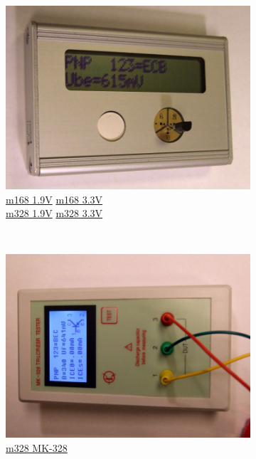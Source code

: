 \documentclass[pdftex,12pt,a4paper,english]{article}
\begin{document}
\begin{figure}[H]
  \begin{subfigure}[b]{.3\textwidth}
    \centering
    \includegraphics[width=1.\textwidth]{../PNG/Fifi_total.JPG}
	  {\href{run:./trunk/mega168_1.9V/.}{m168 1.9V}}
	  {\href{run:./trunk/mega168_3.3V/.}{m168 3.3V}} \\
	  {\href{run:./trunk/mega328_1.9V/.}{m328 1.9V}}
	  {\href{run:./trunk/mega328_3.3V/.}{m328 3.3V}}
  \end{subfigure}
~
  \begin{subfigure}[b]{.3\textwidth}	%
    \centering
    \includegraphics[width=1.\textwidth]{../PNG/MK328_total.JPG}
	  {\href{run:./trunk/mega328_MK-328/.}{m328 MK-328}}
  \end{subfigure}

\end{figure}
\end{document}
